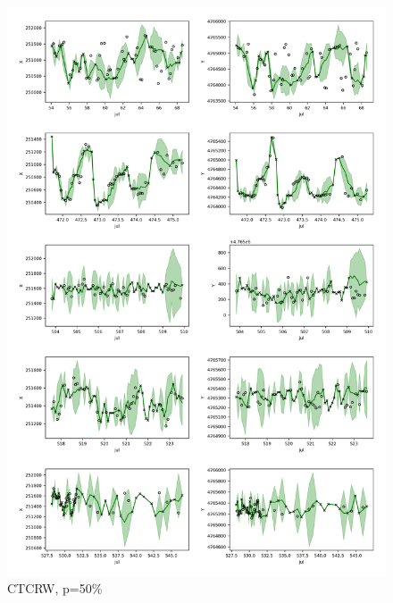 \documentclass[11pt]{article}
\begin{document}
\begin{figure}[h]
  \centering
  \includegraphics[width=\textwidth]{../figure/50_5094_crawl} %
  \caption{CTCRW, p=50\%}
  \label{fig: ctcrw_50} %
\end{figure}
\end{document}
